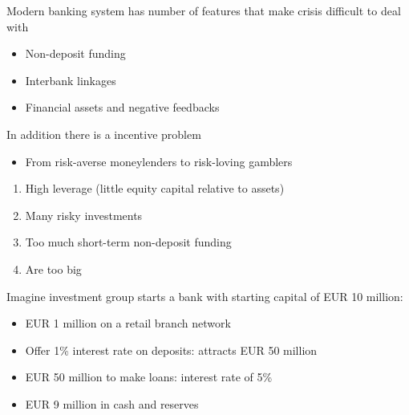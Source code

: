 \documentclass{beamer}
\begin{document}
\begin{frame}
 Modern banking system has number of features that make crisis difficult to deal with
\begin{itemize}
  \item Non-deposit funding
  \item Interbank linkages
  \item Financial assets and negative feedbacks  
\end{itemize}
\end{frame}

\begin{frame}
 In addition there is a incentive problem
 \begin{itemize}
   \item From risk-averse moneylenders to risk-loving gamblers
 \end{itemize}
\begin{enumerate}
  \item High leverage (little equity capital relative to assets)
  \item Many risky investments
  \item Too much short-term non-deposit funding
  \item Are too big
\end{enumerate}
\end{frame}

\begin{frame}
  Imagine investment group starts a bank with starting capital of EUR 10 million:
\begin{itemize}
  \item EUR 1 million on a retail branch network
  \item Offer 1\% interest rate on deposits: attracts EUR 50 million
  \item EUR 50 million to make loans: interest rate of 5\%
  \item EUR 9 million in cash and reserves
\end{itemize}
\end{frame}
\end{document}
